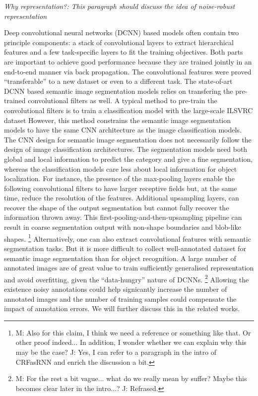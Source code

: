 \noindent
\textit{Why representation?: This paragraph should discuss the idea of noise-robust representation}

\noindent
Deep convolutional neural networks (DCNN) based models often contain two principle components: a stack of convolutional layers to extract hierarchical features and a few  task-specific layers to fit the training objectives.
Both parts are important to achieve good performance because they are trained jointly in an end-to-end manner via back propagation.
The convolutional features were proved ``transferable'' to a new dataset\cite{yosinski2014transferable} or even to a different task\cite{girshick2014rich}.
The state-of-art DCNN based semantic image segmentation models relies on transfering the pre-trained convolutional filters as well.\cite{long2015fully}
A typical method to pre-train the convolutional filters is to train a classification model with the large-scale ILSVRC dataset \cite{russakovsky2015imagenet}
However, this method constrains the semantic image segmentation models to have the same CNN architecture as the image classification models.
The CNN design for semantic image segmentation does not necessarily follow the design of image classification architectures.
The segmentation models need both global and local information to predict the category and give a fine segmentation, whereas the classification models care less about local information for object localization.
For instance, the presence of the max-pooling layers enable the following convolutional filters to have larger receptive fields but, at the same time, reduce the resolution of the features.
Additional upsampling layers, can recover the shape of the output segmentation but cannot fully recover the information thrown away.
This first-pooling-and-then-upsampling pipeline can result in coarse segmentation output \cite{chen2016deeplab} with non-shape boundaries and blob-like shapes.
\footnote{M: Also for this claim, I think we need a reference or something like that. Or other proof indeed...  In addition, I wonder whether we can explain why this may be the case? J: Yes, I can refer to a paragraph in the intro of CRFasRNN and enrich the discussion a bit.}
\noindent
Alternatively, one can also extract convolutional features with semantic segmentation tasks.
But it is more difficult to collect well-annotated dataset for semantic image segmentation than for object recognition.
A large number of annotated images are of great value to train sufficiently generalised representation and avoid overfitting, given the ``data-hungry'' nature of DCNNs.
\footnote{M: For the rest a bit vague... what do we really mean by suffer? Maybe this becomes clear later in the intro...? J: Refrased.}
Allowing the existence noisy annotations could help signicantly increase the number of annotated images and the number of training samples could compensate the impact of annotation errors.
We will further discuss this in the related works.

